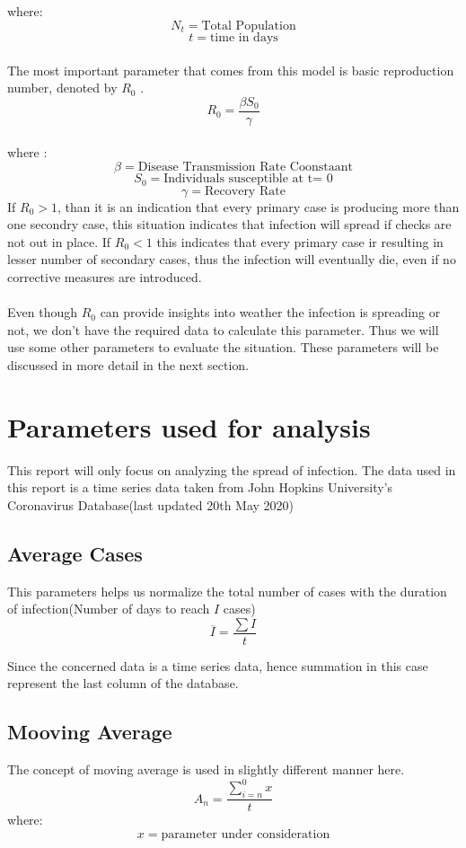 \documentclass[12pt, twosided]{report}  %
\begin{document}
where:
$$ N_t = \text{Total Population}$$
$$ t = \text{time in days} $$
\\
The most important parameter that comes from this model is basic reproduction number, denoted by $R_0$ .
$$ R_0 = \frac{\beta S_0}{\gamma}$$
\\
where :
$$\beta = \text{Disease Transmission Rate Coonstaant}$$
$$ S_0 = \text{Individuals susceptible at t= 0}$$
$$ \gamma = \text{Recovery Rate}$$
If $R_0 > 1$, than it is an indication that every primary case is producing more than one secondry case, this situation indicates that infection will spread if checks are not out in place. If $R_0 < 1$ this indicates that every primary case ir resulting in lesser number of secondary cases, thus the infection will eventually die, even if no corrective measures are introduced.
\\
\\
Even though $R_0$ can provide insights into weather the infection is spreading or not, we don't have the required data to calculate this parameter. Thus we will use some other parameters to evaluate the situation. These parameters will be discussed in more detail in the next section.

\section{Parameters used for analysis}
This report will only focus on analyzing the spread of infection. The data used in this report is a time series data taken from John Hopkins University's Coronavirus Database(last updated 20th May 2020)

\subsection*{Average Cases}
This parameters helps us normalize the total number of cases with the duration of infection(Number of days to reach $I$ cases)
$$ \overline{I} = \frac{\sum I}{t} $$

Since the concerned data is a time series data, hence summation in this case represent the last column of the database.

\subsection*{Mooving Average}
The concept of moving average is used in slightly different manner here.
$$\displaystyle A_n = \frac{\sum_{i=n} ^{0} {x}}{t}$$
where:
$$ x = \text{parameter under consideration}$$
\end{document}

